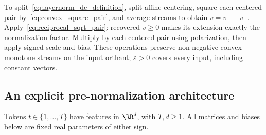 To split~\eqref{eq:layernorm_dc_definition}, split affine centering, square each centered pair by~\eqref{eq:convex_square_pair}, and average streams to obtain $v=v^+-v^-$. Apply~\eqref{eq:reciprocal_sqrt_pair}: recovered $v\ge0$ makes its extension exactly the normalization factor. Multiply by each centered pair using polarization, then apply signed scale and bias. These operations preserve non-negative convex monotone streams on the input orthant; $\varepsilon>0$ covers every input, including constant vectors.

\subsection{An explicit pre-normalization architecture}

Tokens $t\in\{1,\dots,T\}$ have features in $\RR^d$, with $T,d\ge1$. All matrices and biases below are fixed real parameters of either sign.

